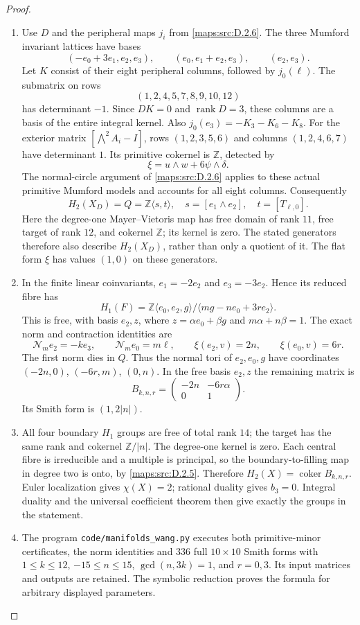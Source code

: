\begin{proof}
\begin{enumerate}[label=\arabic*.,leftmargin=*]
\item Use $D$ and the peripheral maps $j_i$ from \ref{maps:src:D.2.6}. The three
Mumford invariant lattices have bases
\[
 (-e_0+3e_1,e_2,e_3),\qquad
 (e_0,e_1+e_2,e_3),\qquad(e_2,e_3).
\]
Let $K$ consist of their eight peripheral columns, followed by
$j_0(\ell)$. The submatrix on rows
\[
 (1,2,4,5,7,8,9,10,12)
\]
has determinant $-1$. Since $DK=0$ and $\operatorname{rank}D=3$, these columns
are a basis of the entire integral kernel. Also
$j_0(e_3)=-K_3-K_6-K_8$.
For the exterior matrix $[\bigwedge^2 A_i-I]$, rows
$(1,2,3,5,6)$ and columns $(1,2,4,6,7)$ have determinant $1$.
Its primitive cokernel is $\mathbb Z$, detected by
\[
 \xi=u\wedge w+6\psi\wedge\delta.
\]
The normal-circle argument of \ref{maps:src:D.2.6} applies to these actual
primitive Mumford models and accounts for all eight columns.
Consequently
\[
 H_2(X_D)=Q=\mathbb Z\langle s,t\rangle,
 \quad s=[e_1\wedge e_2],\quad t=[T_{\ell,0}].
\]
Here the degree-one Mayer--Vietoris map has free domain of rank
$11$, free target of rank $12$, and cokernel $\mathbb Z$;
its kernel is zero. The stated generators therefore also
describe $H_2(X_D)$, rather than only a quotient of it.
The flat form $\xi$ has values $(1,0)$ on these generators.

\item In the finite linear coinvariants,
$e_1=-2e_2$ and $e_3=-3e_2$. Hence its reduced fibre has
\[
 H_1(F)=
 \mathbb Z\langle e_0,e_2,g\rangle/
 \langle mg-ne_0+3r e_2\rangle.
\]
This is free, with basis $e_2,z$, where
$z=\alpha e_0+\beta g$ and $m\alpha+n\beta=1$.
The exact norm and contraction identities are
\[
 \mathcal N_m e_2=-k e_3,\qquad
 \mathcal N_m e_0=m\ell,\qquad
 \xi(e_2,v)=2n,\qquad \xi(e_0,v)=6r.
\]
The first norm dies in $Q$. Thus the normal tori of
$e_2,e_0,g$ have coordinates $(-2n,0)$, $(-6r,m)$,
$(0,n)$. In the free basis $e_2,z$ the remaining matrix is
\[
 B_{k,n,r}=\begin{pmatrix}-2n&-6r\alpha\\0&1\end{pmatrix}.
\]
Its Smith form is $(1,2|n|)$.

\item All four boundary $H_1$ groups are free of total rank $14$;
the target has the same rank and cokernel $\mathbb Z/|n|$.
The degree-one kernel is zero. Each central fibre is irreducible
and a multiple is principal, so the boundary-to-filling map
in degree two is onto, by \ref{maps:src:D.2.5}. Therefore
$H_2(X)=\operatorname{coker}B_{k,n,r}$.
Euler localization gives $\chi(X)=2$; rational duality gives
$b_3=0$. Integral duality and the universal coefficient theorem
then give exactly the groups in the statement.

\item The program \texttt{code/manifolds\_wang.py} executes both
primitive-minor certificates, the norm identities and 336 full
$10\times10$ Smith forms with $1\leq k\leq12$,
$-15\leq n\leq15$, $\gcd(n,3k)=1$, and $r=0,3$.
Its input matrices and outputs are retained. The symbolic
reduction proves the formula for arbitrary displayed parameters.
\end{enumerate}
\end{proof}

